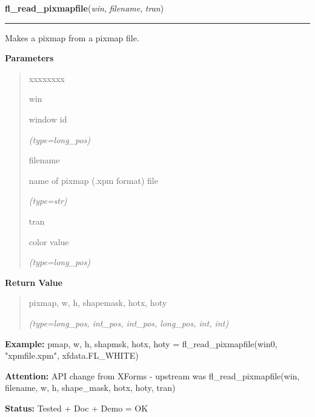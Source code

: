 \hspace{.8\funcindent}\begin{boxedminipage}{\funcwidth}

    \raggedright \textbf{fl\_read\_pixmapfile}(\textit{win}, \textit{filename}, \textit{tran})

    \vspace{-1.5ex}

    \rule{\textwidth}{0.5\fboxrule}
\setlength{\parskip}{2ex}
    Makes a pixmap from a pixmap file.

\setlength{\parskip}{1ex}
      \textbf{Parameters}
      \vspace{-1ex}

      \begin{quote}
        \begin{Ventry}{xxxxxxxx}

          \item[win]

          window id

            {\it (type=long\_pos)}

          \item[filename]

          name of pixmap (.xpm format) file

            {\it (type=str)}

          \item[tran]

          color value

            {\it (type=long\_pos)}

        \end{Ventry}

      \end{quote}

      \textbf{Return Value}
    \vspace{-1ex}

      \begin{quote}
      pixmap, w, h, shapemask, hotx, hoty

      {\it (type=long\_pos, int\_pos, int\_pos, long\_pos, int, int)}

      \end{quote}

\textbf{Example:} pmap, w, h, shapmsk, hotx, hoty = fl\_read\_pixmapfile(win0,         
"xpmfile.xpm", xfdata.FL\_WHITE)



\textbf{Attention:} API change from XForms - upstream was fl\_read\_pixmapfile(win, filename, 
w, h, shape\_mask, hotx, hoty, tran)



\textbf{Status:} Tested + Doc + Demo = OK



    \end{boxedminipage}


